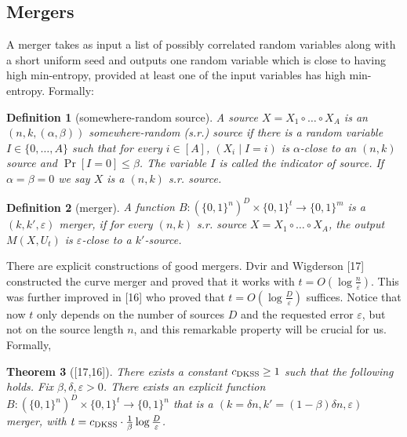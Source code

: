 \documentclass[10pt,a4paper]{article}
\newtheorem{theorem}{Theorem}
\newtheorem{definition}[theorem]{Definition}
\begin{document}
\subsection*{Mergers}
A merger takes as input a list of possibly correlated random variables along with a short uniform seed and outputs one random variable which is close to having high min-entropy, provided at least one of the input variables has high min-entropy. Formally:
\begin{definition}[somewhere-random source]
A source $X=X_1\circ\ldots\circ X_A$ is an $(n,k,(\alpha,\beta))$ somewhere-random (s.r.) source if there is a random variable $I\in\{0,\ldots,A\}$ such that for every $i\in[A]$, $(X_i\mid I=i)$ is $\alpha$-close to an $(n,k)$ source and $\Pr[I=0]\le\beta$. The variable $I$ is called the indicator of source. If $\alpha=\beta=0$ we say $X$ is a $(n,k)$ s.r. source.
\end{definition}
\begin{definition}[merger]
A function $B:(\{0,1\}^n)^D\times\{0,1\}^t\to\{0,1\}^m$ is a $(k,k',\varepsilon)$ merger, if for every $(n,k)$ s.r. source $X=X_1\circ\ldots\circ X_A$, the output $M(X,U_t)$ is $\varepsilon$-close to a $k'$-source.
\end{definition}
There are explicit constructions of good mergers. Dvir and Wigderson [17] constructed the curve merger and proved that it works with $t=O(\log\frac n\varepsilon)$. This was further improved in [16] who proved that $t=O(\log\frac D\varepsilon)$ suffices. Notice that now $t$ only depends on the number of sources $D$ and the requested error $\varepsilon$, but not on the source length $n$, and this remarkable property will be crucial for us. Formally,
\begin{theorem}[{[17,16]}]
There exists a constant $c_{\rm DKSS}\ge1$ such that the following holds. Fix $\beta,\delta,\varepsilon>0$. There exists an explicit function $B:(\{0,1\}^n)^D\times\{0,1\}^t\to\{0,1\}^n$ that is a $(k=\delta n,k'=(1-\beta)\delta n,\varepsilon)$ merger, with $t=c_{\rm DKSS}\cdot\frac1\beta\log\frac D\varepsilon$.
\end{theorem}
\end{document}
